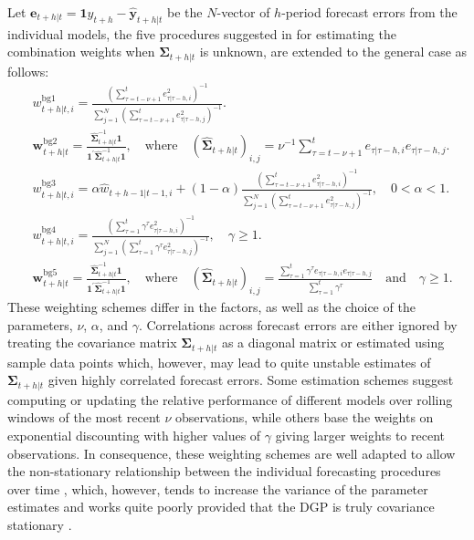 \documentclass[11pt]{article}
\begin{document}
Let $\mathbf{e}_{t+h|t}=\mathbf{1} y_{t+h}-\hat{\mathbf{y}}_{t+h|t}$ be the $N$-vector of $h$-period forecast errors from the individual models, the five procedures suggested in \cite{Bates1969-yj} for estimating the combination weights when $\boldsymbol{\Sigma}_{t+h|t}$ is unknown, are extended to the general case as follows:
\begin{align}
&w_{t+h|t, i}^{\text{bg1}}=\frac{\left( \sum_{\tau=t-\nu+1}^{t} e_{\tau|\tau-h, i}^{2} \right)^{-1}}{\sum_{j=1}^{N}\left(\sum_{\tau=t-\nu+1}^{t} e_{\tau|\tau-h, j}^{2}\right)^{-1}}. \label{eq:weight_bg1}\\
&\boldsymbol{w}_{t+h|t}^{\text{bg2}}=\frac{\hat{\boldsymbol{\Sigma}}_{t+h|t}^{-1}\mathbf{1}}{\mathbf{1}^{\prime} \hat{\boldsymbol{\Sigma}}_{t+h|t}^{-1} \mathbf{1}}, \quad \text{where} \quad (\hat{\boldsymbol{\Sigma}}_{t+h|t})_{i, j}=\nu^{-1} \sum_{\tau=t-\nu+1}^{t} e_{\tau|\tau-h, i} e_{\tau|\tau-h, j}. \nonumber\\
&w_{t+h|t, i}^{\text{bg3}}=\alpha \hat{w}_{t+h-1|t-1, i} + (1-\alpha) \frac{\left( \sum_{\tau=t-\nu+1}^{t} e_{\tau|\tau-h, i}^{2} \right)^{-1}}{\sum_{j=1}^{N}\left(\sum_{\tau=t-\nu+1}^{t} e_{\tau|\tau-h, j}^{2}\right)^{-1}}, \quad 0<\alpha<1. \nonumber\\
&w_{t+h|t, i}^{\text{bg4}}=\frac{\left( \sum_{\tau=1}^{t} \gamma^{\tau} e_{\tau|\tau-h, i}^{2} \right)^{-1}}{\sum_{j=1}^{N}\left(\sum_{\tau=1}^{t} \gamma^{\tau} e_{\tau|\tau-h, j}^{2}\right)^{-1}}, \quad \gamma \geq 1. \label{eq:weight_bg4}\\
&\boldsymbol{w}_{t+h|t}^{\text{bg5}}=\frac{\hat{\boldsymbol{\Sigma}}_{t+h|t}^{-1}\mathbf{1}}{\mathbf{1}^{\prime} \hat{\boldsymbol{\Sigma}}_{t+h|t}^{-1} \mathbf{1}}, \quad \text{where} \quad (\hat{\boldsymbol{\Sigma}}_{t+h|t})_{i, j}=\frac{\sum_{\tau=1}^{t} \gamma^{\tau} e_{\tau|\tau-h, i} e_{\tau|\tau-h, j}}{\sum_{\tau=1}^{t} \gamma^{\tau}} \quad \text{and} \quad \gamma \geq 1. \nonumber
\end{align}
These weighting schemes differ in the factors, as well as the choice of the parameters, $\nu$, $\alpha$, and $\gamma$. Correlations across forecast errors are either ignored by treating the covariance matrix $\boldsymbol{\Sigma}_{t+h|t}$ as a diagonal matrix or estimated using sample data points which, however, may lead to quite unstable estimates of $\boldsymbol{\Sigma}_{t+h|t}$ given highly correlated forecast errors. Some estimation schemes suggest computing or updating the relative performance of different models over rolling windows of the most recent $\nu$ observations, while others base the weights on exponential discounting with higher values of $\gamma$ giving larger weights to recent observations. In consequence, these weighting schemes are well adapted to allow the non-stationary relationship between the individual forecasting procedures over time \citep{Newbold1974-lp}, which, however, tends to increase the variance of the parameter estimates and works quite poorly provided that the DGP is truly covariance stationary \citep{Timmermann2006-en}.
\end{document}
